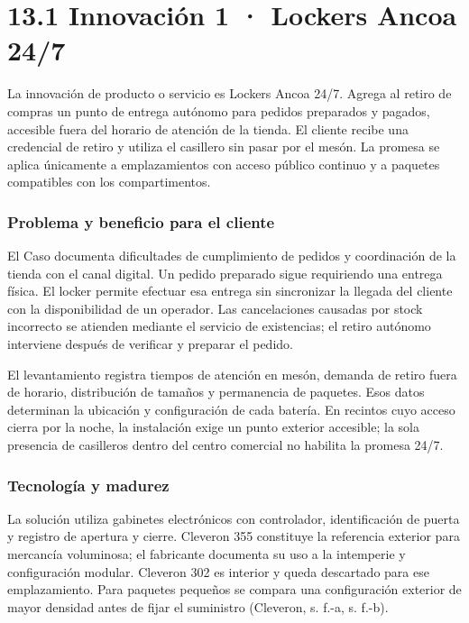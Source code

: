 \documentclass[11pt]{article}
\begin{document}
\section{13.1 Innovación 1 · Lockers Ancoa 24/7}\label{innovaciuxf3n-1}

La innovación de producto o servicio es Lockers Ancoa 24/7. Agrega al retiro de compras un punto de entrega autónomo para pedidos preparados y pagados, accesible fuera del horario de atención de la tienda. El cliente recibe una credencial de retiro y utiliza el casillero sin pasar por el mesón. La promesa se aplica únicamente a emplazamientos con acceso público continuo y a paquetes compatibles con los compartimentos.

\subsubsection{Problema y beneficio para el cliente}\label{problema-y-beneficio-para-el-cliente}

El Caso documenta dificultades de cumplimiento de pedidos y coordinación de la tienda con el canal digital. Un pedido preparado sigue requiriendo una entrega física. El locker permite efectuar esa entrega sin sincronizar la llegada del cliente con la disponibilidad de un operador. Las cancelaciones causadas por stock incorrecto se atienden mediante el servicio de existencias; el retiro autónomo interviene después de verificar y preparar el pedido.

El levantamiento registra tiempos de atención en mesón, demanda de retiro fuera de horario, distribución de tamaños y permanencia de paquetes. Esos datos determinan la ubicación y configuración de cada batería. En recintos cuyo acceso cierra por la noche, la instalación exige un punto exterior accesible; la sola presencia de casilleros dentro del centro comercial no habilita la promesa 24/7.

\subsubsection{Tecnología y madurez}\label{tecnologuxeda-y-madurez}

La solución utiliza gabinetes electrónicos con controlador, identificación de puerta y registro de apertura y cierre. Cleveron 355 constituye la referencia exterior para mercancía voluminosa; el fabricante documenta su uso a la intemperie y configuración modular. Cleveron 302 es interior y queda descartado para ese emplazamiento. Para paquetes pequeños se compara una configuración exterior de mayor densidad antes de fijar el suministro (Cleveron, s. f.-a, s. f.-b).
\end{document}
